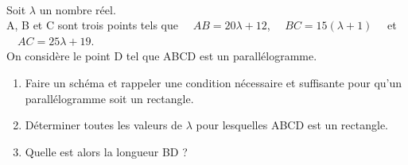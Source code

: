 \documentclass[a4paper,12pt,french]{article}
\begin{document}

\exo{}\\
Soit $\lambda$ un nombre réel.\\
A, B et C sont trois points tels que $\quad AB=20\lambda +12$, $\quad BC=15(\lambda+1)\quad$ et $\quad AC=25\lambda +19$.\\
On considère le point D tel que ABCD est un parallélogramme.
\begin{enumerate}[\bfseries 1.]
	\item 	Faire un schéma et rappeler une condition nécessaire et suffisante pour qu'un parallélogramme soit un rectangle.
	\item 	Déterminer toutes les valeurs de $\lambda$ pour lesquelles ABCD est un rectangle.
	\item	 Quelle est alors la longueur BD ?\\
\end{enumerate}
\end{document}
